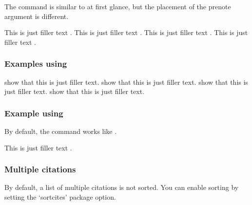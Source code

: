 The  command is similar to  at
first glance, but the placement of the prenote argument is
different.

\begin{filecontents*}{\democodefile}
This is just filler text \parencite{companion}.
This is just filler text \parencite[59]{companion}.
This is just filler text \parencite[see][]{companion}.
This is just filler text \parencite[see][59--63]{companion}.
\end{filecontents*}

%


\subsubsection{Examples using }

\begin{filecontents*}{\democodefile}
\textcite{companion} show that this is just filler text.
\textcite[59]{companion} show that this is just filler text.
\textcite[see][]{companion} show that this is just filler text.
\textcite[see][59--63]{companion} show that this is just filler text.
\end{filecontents*}

%

\subsubsection{Example using }

By default, the  command works like .

\begin{filecontents*}{\democodefile}
This is just filler text \autocite{companion}.
\end{filecontents*}

%

\subsubsection{Multiple citations}

By default, a list of multiple citations is not sorted. You can
enable sorting by setting the `sortcites' package option.

